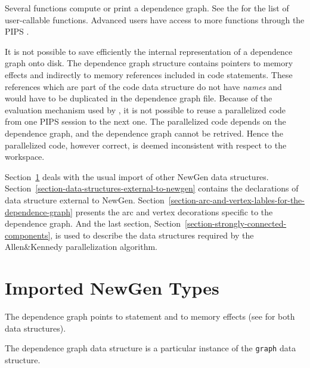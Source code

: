 \documentclass[a4paper]{article}
\begin{document}
Several functions compute or print a dependence graph. See the
 for the list of
user-callable functions. Advanced users have access to more functions
through the PIPS
.

It is not possible to save efficiently
the internal representation of a dependence graph onto disk. The
dependence graph structure contains pointers to memory effects and
indirectly to memory references included in code statements. These
references which are part of the code data structure do not have {\em
  names} and would have to be duplicated in the dependence graph
file. Because of the evaluation mechanism used by , it is not possible to
reuse a parallelized code from one PIPS session to the next one. The
parallelized code depends on the dependence graph, and the dependence
graph cannot be retrived. Hence the parallelized code, however correct, is
deemed inconsistent with respect to the workspace.

Section~\ref{section-imported-newgen-types} deals with the usual import of
other NewGen data structures.
Section~\ref{section-data-structures-external-to-newgen} contains the
declarations of data structure external to NewGen.
Section~\ref{section-arc-and-vertex-lables-for-the-dependence-graph}
presents the arc and vertex decorations specific to the dependence graph.
And the last section, Section~\ref{section-strongly-connected-components},
is used to describe the data structures required by the Allen\&Kennedy
parallelization algorithm.

\section{Imported NewGen Types}
\label{section-imported-newgen-types}

The dependence graph points to statement and to memory effects (see
 for
both data structures).

\begin{comment}
\domain{Import statement from "ri.newgen"}
{}
\end{comment}

{}

The dependence graph data structure is  a particular instance of the
\verb/graph/ data structure.
\end{document}
